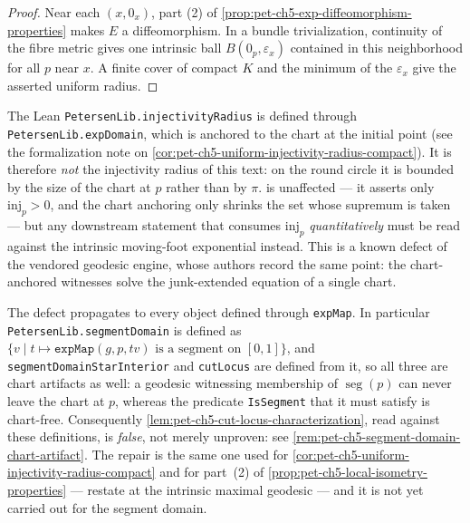 \begin{proof}
  \leanok
  \sketch
  Near each $(x,0_x)$, part (2) of
  \cref{prop:pet-ch5-exp-diffeomorphism-properties} makes $E$ a diffeomorphism.
  In a bundle trivialization, continuity of the fibre metric gives one intrinsic
  ball $B(0_p,\varepsilon_x)$ contained in this neighborhood for all $p$ near $x$.
  A finite cover of compact $K$ and the minimum of the $\varepsilon_x$ give the
  asserted uniform radius.
\end{proof}

\begin{remark}
  \label{rem:pet-ch5-injectivity-radius-chart-artifact}
  The Lean \texttt{PetersenLib.injectivityRadius} is defined through
  \texttt{PetersenLib.expDomain}, which is anchored to the chart at the initial
  point (see the formalization note on
  \cref{cor:pet-ch5-uniform-injectivity-radius-compact}).  It is therefore
  \emph{not} the injectivity radius of this text: on the round circle it is bounded
  by the size of the chart at $p$ rather than by $\pi$.
   is unaffected — it asserts only
  $\mathrm{inj}_p>0$, and the chart anchoring only shrinks the set whose supremum
  is taken — but any downstream statement that consumes $\mathrm{inj}_p$
  \emph{quantitatively} must be read against the intrinsic moving-foot exponential
  instead.  This is a known defect of the vendored geodesic engine, whose authors
  record the same point: the chart-anchored witnesses solve the junk-extended
  equation of a single chart.

  The defect propagates to every object defined through \texttt{expMap}.  In
  particular \texttt{PetersenLib.segmentDomain} is defined as
  $\{v\mid t\mapsto\texttt{expMap}(g,p,tv)\text{ is a segment on }[0,1]\}$, and
  \texttt{segmentDomainStarInterior} and \texttt{cutLocus} are defined from it, so
  all three are chart artifacts as well: a geodesic witnessing membership of
  $\operatorname{seg}(p)$ can never leave the chart at $p$, whereas the predicate
  \texttt{IsSegment} that it must satisfy is chart-free.  Consequently
  \cref{lem:pet-ch5-cut-locus-characterization}, read against these definitions, is
  \emph{false}, not merely unproven: see
  \cref{rem:pet-ch5-segment-domain-chart-artifact}.  The repair is the same one
  used for \cref{cor:pet-ch5-uniform-injectivity-radius-compact} and for part~(2)
  of \cref{prop:pet-ch5-local-isometry-properties} — restate at the intrinsic
  maximal geodesic — and it is not yet carried out for the segment domain.
\end{remark}

